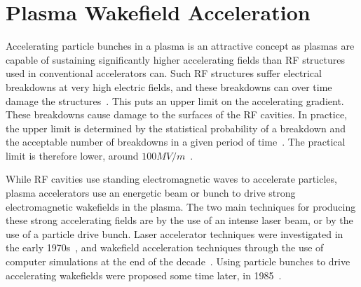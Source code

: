 \section{Plasma Wakefield Acceleration}
\label{Int:PWFA}

Accelerating particle bunches in a plasma is an attractive concept as plasmas are capable of sustaining significantly higher accelerating fields than RF structures used in conventional accelerators can.
Such RF structures suffer electrical breakdowns at very high electric fields, and these breakdowns can over time damage the structures~\cite{braun:2003}.
This puts an upper limit on the accelerating gradient.
These breakdowns cause damage to the surfaces of the RF cavities.
In practice, the upper limit is determined by the statistical probability of a breakdown and the acceptable number of breakdowns in a given period of time~\cite{pritzkau:2002}.
The practical limit is therefore lower, around $100\unit{MV/m}$~\cite{aicheler:2012}.

While RF cavities use standing electromagnetic waves to accelerate particles, plasma accelerators use an energetic beam or bunch to drive strong electromagnetic wakefields in the plasma.
The two main techniques for producing these strong accelerating fields are by the use of an intense laser beam, or by the use of a particle drive bunch.
Laser accelerator techniques were investigated in the early 1970s~\cite{chan:1971, palmer:1972}, and wakefield acceleration techniques through the use of computer simulations at the end of the decade~\cite{tajima:1979}.
Using particle bunches to drive accelerating wakefields were proposed some time later, in 1985~\cite{chen:1985}.

